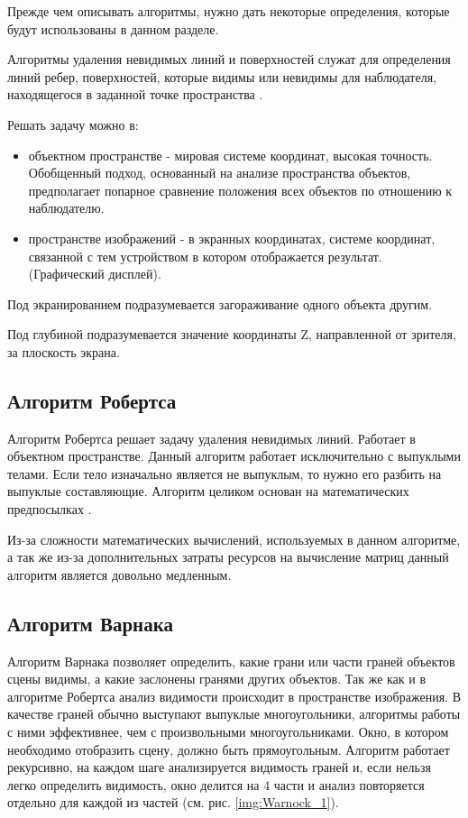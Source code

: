 Прежде чем описывать алгоритмы, нужно дать некоторые определения, которые будут использованы в данном разделе.

Алгоритмы удаления невидимых линий и поверхностей служат для определения линий ребер, поверхностей, которые видимы или невидимы для наблюдателя, находящегося в заданной точке пространства \cite{rogers}.

Решать задачу можно в:
\begin{itemize}
	\item объектном пространстве - мировая системе координат, высокая точность. Обобщенный подход, основанный на анализе пространства объектов, предполагает попарное сравнение положения всех объектов по отношению к наблюдателю.
	\item пространстве изображений - в экранных координатах, системе координат, связанной с тем устройством в котором отображается результат. (Графический дисплей).
\end{itemize}

Под экранированием подразумевается загораживание одного объекта другим.

Под глубиной подразумевается значение координаты Z, направленной от зрителя, за плоскость экрана.

\subsection{Алгоритм Робертса}

Алгоритм Робертса решает задачу удаления невидимых линий. Работает в объектном пространстве. Данный алгоритм работает исключительно с выпуклыми телами. Если тело изначально является не выпуклым, то нужно его разбить на выпуклые составляющие. Алгоритм целиком основан на математических предпосылках \cite{rogers}.

Из-за сложности математических вычислений, используемых в данном алгоритме, а так же из-за дополнительных затраты ресурсов на вычисление матриц данный алгоритм является довольно медленным.

\subsection{Алгоритм Варнака}

Алгоритм Варнака \cite{rogers,shykin,bayackovskiy} позволяет определить, какие грани или части граней объектов сцены видимы, а какие заслонены гранями других объектов. Так же как и в алгоритме Робертса анализ видимости происходит в пространстве изображения. В качестве граней обычно выступают выпуклые многоугольники, алгоритмы работы с ними эффективнее, чем с произвольными многоугольниками. Окно, в котором необходимо отобразить сцену, должно быть прямоугольным. Алгоритм работает рекурсивно, на каждом шаге анализируется видимость граней и, если нельзя легко определить видимость, окно делится на 4 части и анализ повторяется отдельно для каждой из частей (см. рис. \ref{img:Warnock_1}).


